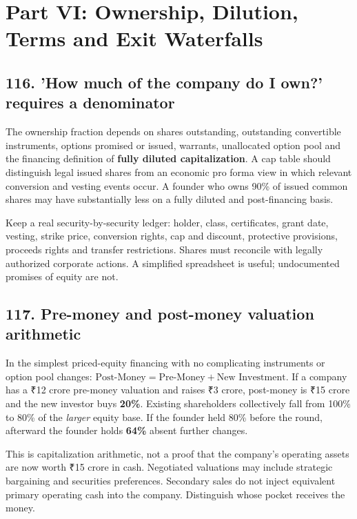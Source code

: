 \section{Part VI: Ownership, Dilution, Terms and Exit Waterfalls}

\subsection{116. 'How much of the company do I own?' requires a denominator}


The ownership fraction depends on shares outstanding, outstanding convertible instruments, options promised or issued, warrants, unallocated option pool and the financing definition of \textbf{fully diluted capitalization}. A cap table should distinguish legal issued shares from an economic pro forma view in which relevant conversion and vesting events occur. A founder who owns 90\% of issued common shares may have substantially less on a fully diluted and post-financing basis.

Keep a real security-by-security ledger: holder, class, certificates, grant date, vesting, strike price, conversion rights, cap and discount, protective provisions, proceeds rights and transfer restrictions. Shares must reconcile with legally authorized corporate actions. A simplified spreadsheet is useful; undocumented promises of equity are not.

\subsection{117. Pre-money and post-money valuation arithmetic}


In the simplest priced-equity financing with no complicating instruments or option pool changes: $\text{Post-Money} = \text{Pre-Money} + \text{New Investment}$. If a company has a ₹12 crore pre-money valuation and raises ₹3 crore, post-money is ₹15 crore and the new investor buys \textbf{20\%}. Existing shareholders collectively fall from 100\% to 80\% of the \textit{larger} equity base. If the founder held 80\% before the round, afterward the founder holds \textbf{64\%} absent further changes.

This is capitalization arithmetic, not a proof that the company's operating assets are now worth ₹15 crore in cash. Negotiated valuations may include strategic bargaining and securities preferences. Secondary sales do not inject equivalent primary operating cash into the company. Distinguish whose pocket receives the money.

